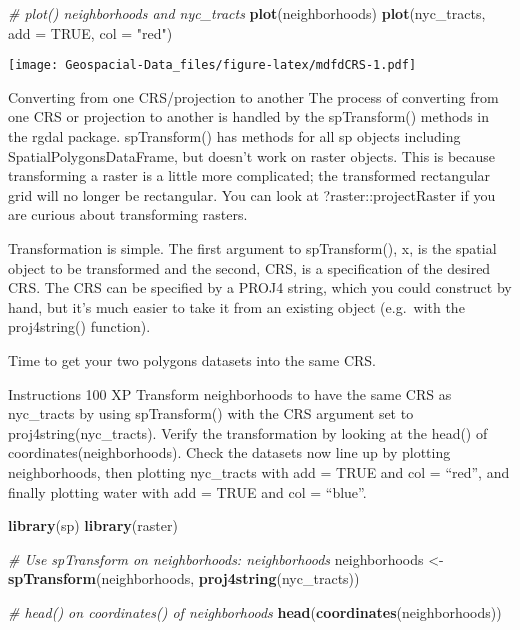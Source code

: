 \documentclass[]{article}
\newenvironment{Shaded}{\begin{snugshade}}{\end{snugshade}}
\newcommand{\CommentTok}[1]{\textcolor[rgb]{0.56,0.35,0.01}{\textit{#1}}}
\newcommand{\DataTypeTok}[1]{\textcolor[rgb]{0.13,0.29,0.53}{#1}}
\newcommand{\KeywordTok}[1]{\textcolor[rgb]{0.13,0.29,0.53}{\textbf{#1}}}
\newcommand{\NormalTok}[1]{#1}
\newcommand{\OtherTok}[1]{\textcolor[rgb]{0.56,0.35,0.01}{#1}}
\newcommand{\StringTok}[1]{\textcolor[rgb]{0.31,0.60,0.02}{#1}}
\begin{document}
\begin{Shaded}
\begin{Highlighting}[]
\CommentTok{# plot() neighborhoods and nyc_tracts}
\KeywordTok{plot}\NormalTok{(neighborhoods)}
\KeywordTok{plot}\NormalTok{(nyc_tracts, }\DataTypeTok{add =} \OtherTok{TRUE}\NormalTok{, }\DataTypeTok{col =} \StringTok{"red"}\NormalTok{)}
\end{Highlighting}
\end{Shaded}

\texttt{[image: Geospacial-Data\_files/figure-latex/mdfdCRS-1.pdf]}

Converting from one CRS/projection to another The process of converting
from one CRS or projection to another is handled by the spTransform()
methods in the rgdal package. spTransform() has methods for all sp
objects including SpatialPolygonsDataFrame, but doesn't work on raster
objects. This is because transforming a raster is a little more
complicated; the transformed rectangular grid will no longer be
rectangular. You can look at ?raster::projectRaster if you are curious
about transforming rasters.

Transformation is simple. The first argument to spTransform(), x, is the
spatial object to be transformed and the second, CRS, is a specification
of the desired CRS. The CRS can be specified by a PROJ4 string, which
you could construct by hand, but it's much easier to take it from an
existing object (e.g.~with the proj4string() function).

Time to get your two polygons datasets into the same CRS.

Instructions 100 XP Transform neighborhoods to have the same CRS as
nyc\_tracts by using spTransform() with the CRS argument set to
proj4string(nyc\_tracts). Verify the transformation by looking at the
head() of coordinates(neighborhoods). Check the datasets now line up by
plotting neighborhoods, then plotting nyc\_tracts with add = TRUE and
col = ``red'', and finally plotting water with add = TRUE and col =
``blue''.

\begin{Shaded}
\begin{Highlighting}[]
\KeywordTok{library}\NormalTok{(sp)}
\KeywordTok{library}\NormalTok{(raster)}

\CommentTok{# Use spTransform on neighborhoods: neighborhoods}
\NormalTok{neighborhoods <-}\StringTok{ }\KeywordTok{spTransform}\NormalTok{(neighborhoods,   }
                             \KeywordTok{proj4string}\NormalTok{(nyc_tracts))}

\CommentTok{# head() on coordinates() of neighborhoods}
\KeywordTok{head}\NormalTok{(}\KeywordTok{coordinates}\NormalTok{(neighborhoods))}
\end{Highlighting}
\end{Shaded}
\end{document}
